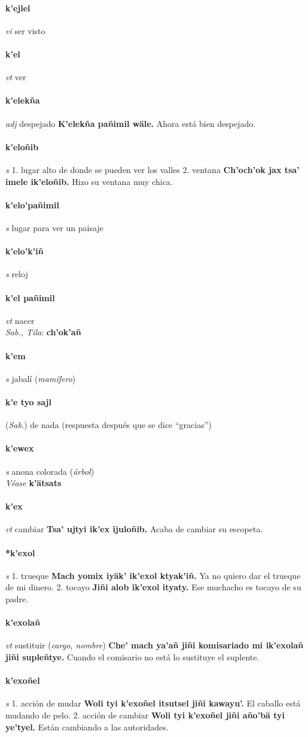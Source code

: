 \documentclass{scrbook}
\newcommand{\entry}[1]{\paragraph{#1}}
\newcommand{\onedefinition}[1]{#1.}
\newcommand{\partofspeech}[1]{\textit{#1}}
\newcommand{\spanishtranslation}[1]{#1}
\newcommand{\clarification}[1]{(\textit{#1})}
\newcommand{\cholexample}[1]{\textbf{#1}}
\newcommand{\exampletranslation}[1]{#1}
\newcommand{\dialectvariant}[1]{\\\textit{#1}:}
\newcommand{\dialectword}[1]{\textbf{#1}}
\newcommand{\alsosee}[1]{\\\textit{Véase} \textbf{#1}}
\newcommand{\relevantdialect}[1]{(\textit{#1})}
\begin{document}
\begin{multicols}{2}
\entry{k'ejlel}
\partofspeech{vi}
\spanishtranslation{ser visto}

\entry{k'el}
\partofspeech{vt}
\spanishtranslation{ver}

\entry{k'elekña}
\partofspeech{adj}
\spanishtranslation{despejado}
\cholexample{K'elekña pañimil wäle.}
\exampletranslation{Ahora está bien despejado.}

\entry{k'eloñib}
\partofspeech{s}
\onedefinition{1}
\spanishtranslation{lugar alto de donde se pueden ver los valles}
\onedefinition{2}
\spanishtranslation{ventana}
\cholexample{Ch'och'ok jax tsa' imele ik'eloñib.}
\exampletranslation{Hizo su ventana muy chica.}

\entry{k'elo'pañimil}
\partofspeech{s}
\spanishtranslation{lugar para ver un paisaje}

\entry{k'elo'k'iñ}
\partofspeech{s}
\spanishtranslation{reloj}

\entry{k'el pañimil}
\partofspeech{vt}
\spanishtranslation{nacer}
\dialectvariant{Sab., Tila}
\dialectword{ch'ok'añ}

\entry{k'em}
\partofspeech{s}
\spanishtranslation{jabalí}
\clarification{mamífero}

\entry{k'e tyo sajl}
\relevantdialect{Sab.}
\spanishtranslation{de nada (respuesta después que se dice “gracias”)}

\entry{k'ewex}
\partofspeech{s}
\spanishtranslation{anona colorada}
\clarification{árbol}
\alsosee{k'ätsats}

\entry{k'ex}
\partofspeech{vt}
\spanishtranslation{cambiar}
\cholexample{Tsa' ujtyi ik'ex ijuloñib.}
\exampletranslation{Acaba de cambiar su escopeta.}

\entry{*k'exol}
\partofspeech{s}
\onedefinition{1}
\spanishtranslation{trueque}
\cholexample{Mach yomix iyäk' ik'exol ktyak'iñ.}
\exampletranslation{Ya no quiero dar el trueque de mi dinero.}
\onedefinition{2}
\spanishtranslation{tocayo}
\cholexample{Jiñi alob ik'exol ityaty.}
\exampletranslation{Ese muchacho es tocayo de su padre.}

\entry{k'exolañ}
\partofspeech{vt}
\spanishtranslation{sustituir}
\clarification{cargo, nombre}
\cholexample{Che' mach ya'añ jiñi komisariado mi ik'exolañ jiñi supleñtye.}
\exampletranslation{Cuando el comisario no está lo sustituye el suplente.}

\entry{k'exoñel}
\partofspeech{s}
\onedefinition{1}
\spanishtranslation{acción de mudar}
\cholexample{Woli tyi k'exoñel itsutsel jiñi kawayu'.}
\exampletranslation{El caballo está mudando de pelo.}
\onedefinition{2}
\spanishtranslation{acción de cambiar}
\cholexample{Woli tyi k'exoñel jiñi año'bä tyi ye'tyel.}
\exampletranslation{Están cambiando a las autoridades.}


\end{multicols}
\end{document}
